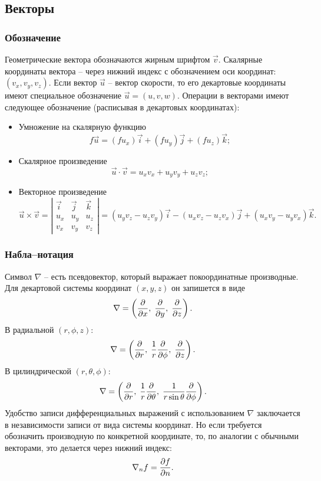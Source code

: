 \subsection{Векторы}

\subsubsection{Обозначение}

Геометрические вектора обозначаются жирным шрифтом $\vec v$.
Скалярные координаты вектора -- через нижний индекс с обозначением
оси координат: $\left(v_x, v_y, v_z\right)$.
Если вектор $\vec u$ -- вектор скорости, то его декартовые координаты
имеют специальное обозначение $\vec u = \left(u, v, w\right)$.
Операции в векторами имеют следующее обозначение (расписывая в декартовых координатах):
\begin{itemize}
\item
Умножение на скалярную функцию
\begin{equation}
\label{eq:vec_scalar}
f \vec u = (f u_x)\vec i + (f u_y)\vec j + (f u_z)\vec k;
\end{equation}
\item
Скалярное произведение
\begin{equation}
\label{eq:vec_dot}
\vec u \cdot \vec v = u_x v_x + u_y v_y + u_z v_z;
\end{equation}
\item
Векторное произведение
\begin{equation}
\label{eq:vec_cross}
\vec u\times\vec v = 
\left|
\begin{array}{ccc}
\vec i & \vec j & \vec k \\
u_x & u_y & u_z \\
v_x & v_y & v_z
\end{array}
\right| = 
\left(u_y v_z - u_z v_y\right)\vec i -
\left(u_x v_z - u_z v_x\right)\vec j +
\left(u_x v_y - u_y v_x\right)\vec k.
\end{equation}

\end{itemize}


\subsubsection{Набла--нотация}

Символ $\nabla$ -- есть псевдовектор, который выражает
покоординатные производные.
Для декартовой системы координат $(x, y, z)$ он запишется в виде
$$
\nabla = \left( \frac{\partial }{\partial x}, \; \frac{\partial }{\partial y}, \; \frac{\partial }{\partial z} \right).
$$
В радиальной $(r, \phi, z)$:
$$
\nabla = \left( \frac{\partial }{\partial r}, \; \frac{1}{r}\frac{\partial }{\partial \phi}, \; \frac{\partial }{\partial z} \right).
$$
В цилиндрической $(r, \theta, \phi)$:
$$
\nabla = \left( \frac{\partial }{\partial r}, \; \frac{1}{r}\frac{\partial }{\partial \theta}, \; \frac{1}{r\sin\theta}\frac{\partial }{\partial \phi} \right).
$$
Удобство записи дифференциальных выражений с использованием $\nabla$ заключается в независимости записи от
вида системы координат.
Но если требуется обозначить производную по конкретной координате,
то, по аналогии с обычными векторами, это делается через нижний индекс:
$$
\nabla_n f = \frac{\partial f}{\partial n}.
$$

